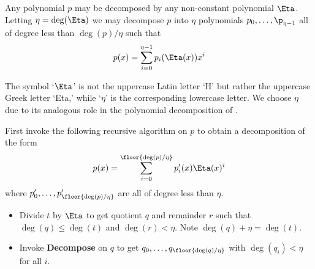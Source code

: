 

\begin{theorem}
    Any polynomial $p$ may be decomposed by any non-constant polynomial $\Eta$.
    Letting $\eta = \deg(\Eta)$ we may decompose $p$ into $\eta$ polynomials $p_0,\dots,\p_{\eta-1}$ all of degree less than $\deg(p)/\eta$ such that
    \begin{align}
        p(x) = \sum_{i=0}^{\eta-1} p_i(\Eta(x))x^i
    \end{align}
    \begin{remark}
        The symbol `$\Eta$' is not the uppercase Latin letter `H' but rather the uppercase Greek letter `Eta,' while `$\eta$' is the corresponding lowercase letter.
        We choose $\eta$ due to its analogous role in the polynomial decomposition of \cite{BBHR18}.
    \end{remark}

    \proof
    First invoke the following recursive algorithm on $p$ to obtain a decomposition of the form
    \begin{align}
        p(x) = \sum_{i=0}^{\floor{\deg(p)/\eta}} p'_i(x)\Eta(x)^i
    \end{align}
    where $p'_0,\dots,p'_{\floor{\deg(p)/\eta}}$ are all of degree less than $\eta$.

    \begin{itemize}
        \textbf{Decompose}.
        \\
        Input: polynomial $t$.
        \\
        Output: polynomials $t_0,\dots,t_{\floor{\deg(t)/\eta}}$ with $\deg(t_i)<\eta$ for all $i$ such that
        \begin{align}
            t(x) = \sum_{i=0}^{\floor{\deg(t)/\eta}} t_i(x)\Eta(x)^i
        \end{align}
        
        \item
        Divide $t$ by $\Eta$ to get quotient $q$ and remainder $r$ such that $\deg(q)\leq\deg(t)$ and $\deg(r)<\eta$.
        Note $\deg(q)+\eta = \deg(t)$.

        \item
        Invoke \textbf{Decompose} on $q$ to get $q_0,\dots,q_{\floor{\deg(q)/\eta}}$ with $\deg(q_i)<\eta$ for all $i$.


\end{itemize}
\end{theorem}

